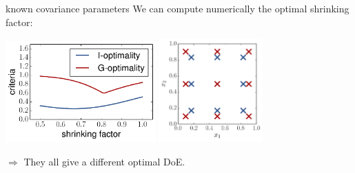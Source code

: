 \documentclass{beamer}
\begin{document}
\begin{frame}{known covariance parameters}
We can compute numerically the optimal shrinking factor:
\vspace{2mm}
\begin{center}
\includegraphics[height=3.9cm]{figures/python/opt_IG} \qquad
\includegraphics[height=4cm]{figures/python/opt_XIG}
\end{center}
\vspace{2mm}
$\Rightarrow$ They all give a different optimal DoE.
\end{frame}

\end{document}
